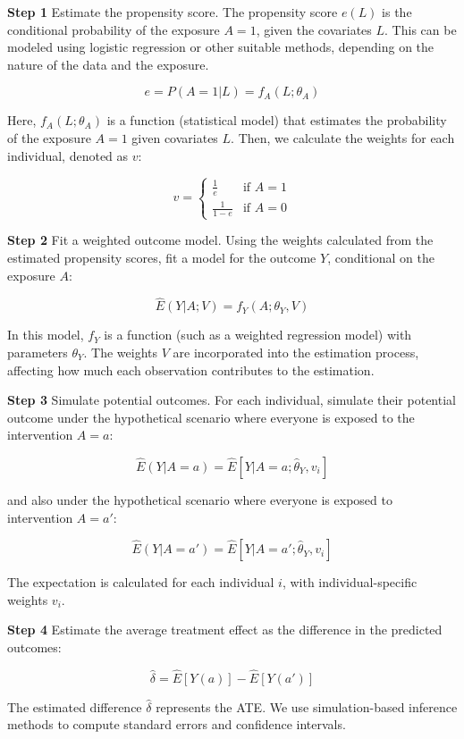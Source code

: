 \documentclass[
  singlecolumn]{article}
\begin{document}
\textbf{Step 1} Estimate the propensity score. The propensity score
\(e(L)\) is the conditional probability of the exposure \(A = 1\), given
the covariates \(L\). This can be modeled using logistic regression or
other suitable methods, depending on the nature of the data and the
exposure.

\[e = P(A = 1 | L) = f_A(L; \theta_A)\]

Here, \(f_A(L; \theta_A)\) is a function (statistical model) that
estimates the probability of the exposure \(A = 1\) given covariates
\(L\). Then, we calculate the weights for each individual, denoted as
\(v\):

\[
v = 
\begin{cases} 
\frac{1}{e} & \text{if } A = 1 \\
\frac{1}{1-e} & \text{if } A = 0 
\end{cases}
\]

\textbf{Step 2} Fit a weighted outcome model. Using the weights
calculated from the estimated propensity scores, fit a model for the
outcome \(Y\), conditional on the exposure \(A\):

\[ \hat{E}(Y|A; V) = f_Y(A; \theta_Y, V) \]

In this model, \(f_Y\) is a function (such as a weighted regression
model) with parameters \(\theta_Y\). The weights \(V\) are incorporated
into the estimation process, affecting how much each observation
contributes to the estimation.

\textbf{Step 3} Simulate potential outcomes. For each individual,
simulate their potential outcome under the hypothetical scenario where
everyone is exposed to the intervention \(A=a\):

\[\hat{E}(Y|A=a)  = \hat{E}[Y|A=a; \hat{\theta}_Y,  v_i]\]

and also under the hypothetical scenario where everyone is exposed to
intervention \(A=a'\):

\[\hat{E}(Y|A=a')  = \hat{E}[Y|A=a'; \hat{\theta}_Y,  v_i]\]

The expectation is calculated for each individual \(i\), with
individual-specific weights \(v_i\).

\textbf{Step 4} Estimate the average treatment effect as the difference
in the predicted outcomes:

\[\hat{\delta} = \hat{E}[Y(a)] - \hat{E}[Y(a')]\]

The estimated difference \(\hat{\delta}\) represents the ATE. We use
simulation-based inference methods to compute standard errors and
confidence intervals.
\end{document}
